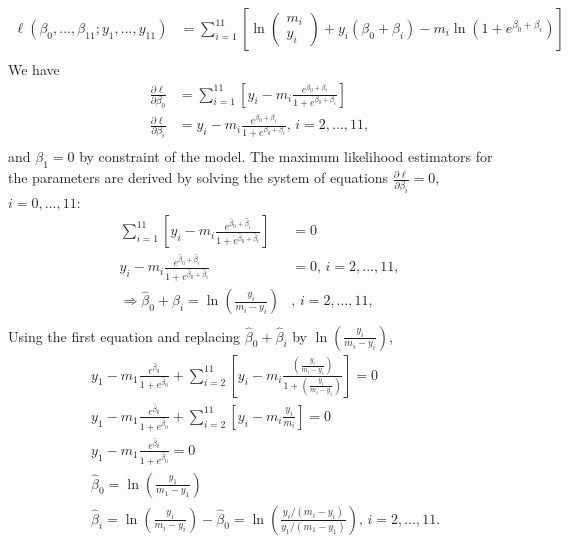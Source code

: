 \begin{solution}{5.9}
\begin{enumerate}
\begin{align*}
\ell(\beta_{0},...,\beta_{11};y_{1},...,y_{11})&=\sum_{i=1}^{11} \left[\ln\begin{pmatrix} m_{i} \\ y_{i} \end{pmatrix}+y_{i}(\beta_{0}+\beta_{i})-m_{i}\ln(1+e^{\beta_{0}+\beta_{i}})\right]\\
\end{align*} We have
\begin{align*}
\frac{\partial \ell}{\partial \beta_{0}}&=\sum_{i=1}^{11} \left[y_{i}-m_{i}\frac{e^{\beta_{0}+\beta_{i}}}{1+e^{\beta_{0}+\beta_{i}}}\right]\\
\frac{\partial \ell}{\partial \beta_{i}}&=y_{i}-m_{i}\frac{e^{\beta_{0}+\beta_{i}}}{1+e^{\beta_{0}+\beta_{i}}} \mbox{,  } i=2,...,11,\\
\end{align*} and $\beta_{1}=0$ by constraint of the model. The maximum likelihood estimators for the parameters are derived by solving the system of equations $\frac{\partial \ell}{\partial \beta_{i}}=0,$ $i=0,...,11$:
\begin{align*}
\sum_{i=1}^{11} \left[y_{i}-m_{i}\frac{e^{\hat{\beta}_{0}+\hat{\beta}_{i}}}{1+e^{\hat{\beta}_{0}+\hat{\beta}_{i}}}\right]&=0\\
y_{i}-m_{i}\frac{e^{\hat{\beta}_{0}+\hat{\beta}_{i}}}{1+e^{\hat{\beta}_{0}+\hat{\beta}_{i}}}&=0 \mbox{,  } i=2,...,11,\\
\Rightarrow \hat{\beta}_{0}+\hat{\beta}_{i}=\ln\left(\frac{y_{i}}{m_{i}-y_{i}}\right)& \mbox{,  } i=2,...,11,\\
\end{align*}  Using the first equation and replacing $\hat{\beta}_{0}+\hat{\beta}_{i}$ by $\ln\left(\frac{y_{i}}{m_{i}-y_{i}}\right)$,
\begin{align*}
&y_{1}-m_{1}\frac{e^{\hat{\beta}_{0}}}{1+e^{\hat{\beta}_{0}}}+\sum_{i=2}^{11} \left[y_{i}-m_{i}\frac{\left(\frac{y_{i}}{m_{i}-y_{i}}\right)}{1+\left(\frac{y_{i}}{m_{i}-y_{i}}\right)}\right]=0\\
&y_{1}-m_{1}\frac{e^{\hat{\beta}_{0}}}{1+e^{\hat{\beta}_{0}}}+\sum_{i=2}^{11} \left[y_{i}-m_{i}\frac{y_{i}}{m_{i}}\right]=0\\
&y_{1}-m_{1}\frac{e^{\hat{\beta}_{0}}}{1+e^{\hat{\beta}_{0}}}=0\\
&\hat{\beta}_{0}=\ln\left(\frac{y_{1}}{m_{1}-y_{1}}\right)\\
&\hat{\beta}_{i}=\ln\left(\frac{y_{i}}{m_{i}-y_{i}}\right)-\hat{\beta}_{0}=\ln\left(\frac{y_{i}/(m_{i}-y_{i})}{y_{1}/(m_{1}-y_{1})}\right)  \mbox{,  } i=2,...,11.\\

\end{align*}
\end{enumerate}
\end{solution}
